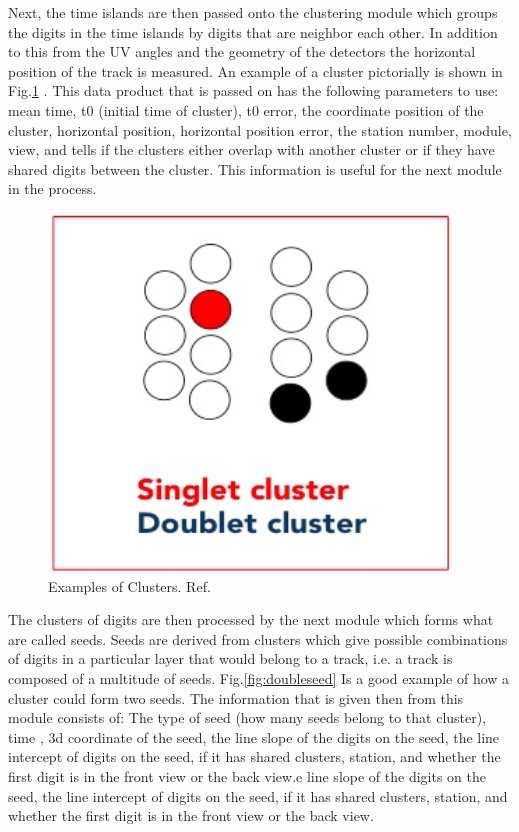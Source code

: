 \documentclass[./Thesis]{subfiles}
\begin{document}
	Next, the time islands are then passed onto the clustering module which groups the digits in the time islands by digits that are neighbor each other.  In addition to this from the UV angles and the geometry of the detectors the horizontal position of the track is measured.  An example of a cluster pictorially is shown in Fig.\ref{fig:cluster} .  This data product that is passed on has the following parameters to use: mean time, t0 (initial time of cluster), t0 error, the coordinate position of the cluster, horizontal position, horizontal position error, the station number, module, view, and tells if the clusters either overlap with another cluster or if they have shared digits between the cluster. This information is useful for the next module in the process.
	
\begin{figure}
	\centerline{\includegraphics[height=95mm]{Clusters.jpeg}}
	\caption[Cluster Example]{ Examples of Clusters.  Ref.\cite{trackerWiki}
	}
	\label{fig:cluster}
\end{figure} 
	
	The clusters of digits are then processed by the next module which forms what are called seeds.  Seeds are derived from clusters which give possible combinations of digits in a particular layer that would belong to a track, i.e. a track is composed of a multitude of seeds.  Fig.\ref{fig:doubleseed} Is a good example of how a cluster could form two seeds.  The information that is given then from this module consists of: The type of seed (how many seeds belong to that cluster), time , 3d coordinate of the seed, the line slope of the digits on the seed, the line intercept of digits on the seed, if it has shared clusters, station, and whether the first digit is in the front view or the back view.e line slope of the digits on the seed, the line intercept of digits on the seed, if it has shared clusters, station, and whether the first digit is in the front view or the back view.
\end{document}
